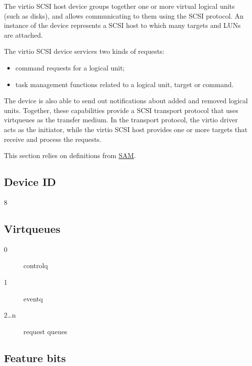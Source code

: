 The virtio SCSI host device groups together one or more virtual
logical units (such as disks), and allows communicating to them
using the SCSI protocol. An instance of the device represents a
SCSI host to which many targets and LUNs are attached.

The virtio SCSI device services two kinds of requests:
\begin{itemize}
\item command requests for a logical unit;

\item task management functions related to a logical unit, target or
  command.
\end{itemize}

The device is also able to send out notifications about added and
removed logical units. Together, these capabilities provide a
SCSI transport protocol that uses virtqueues as the transfer
medium. In the transport protocol, the virtio driver acts as the
initiator, while the virtio SCSI host provides one or more
targets that receive and process the requests.

This section relies on definitions from \hyperref[intro:SAM]{SAM}.

\subsection{Device ID}\label{sec:Device Types / SCSI Host Device / Device ID}
  8

\subsection{Virtqueues}\label{sec:Device Types / SCSI Host Device / Virtqueues}

\begin{description}
\item[0] controlq
\item[1] eventq
\item[2\ldots n] request queues
\end{description}

\subsection{Feature bits}\label{sec:Device Types / SCSI Host Device / Feature bits}

